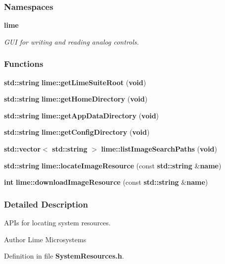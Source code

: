 \subsubsection*{Namespaces}
\begin{DoxyCompactItemize}
\item 
 {\bf lime}
\begin{DoxyCompactList}\small\item\em G\+UI for writing and reading analog controls. \end{DoxyCompactList}\end{DoxyCompactItemize}
\subsubsection*{Functions}
\begin{DoxyCompactItemize}
\item 
{\bf std\+::string} {\bf lime\+::get\+Lime\+Suite\+Root} ({\bf void})
\item 
{\bf std\+::string} {\bf lime\+::get\+Home\+Directory} ({\bf void})
\item 
{\bf std\+::string} {\bf lime\+::get\+App\+Data\+Directory} ({\bf void})
\item 
{\bf std\+::string} {\bf lime\+::get\+Config\+Directory} ({\bf void})
\item 
{\bf std\+::vector}$<$ {\bf std\+::string} $>$ {\bf lime\+::list\+Image\+Search\+Paths} ({\bf void})
\item 
{\bf std\+::string} {\bf lime\+::locate\+Image\+Resource} (const {\bf std\+::string} \&{\bf name})
\item 
{\bf int} {\bf lime\+::download\+Image\+Resource} (const {\bf std\+::string} \&{\bf name})
\end{DoxyCompactItemize}


\subsubsection{Detailed Description}
A\+P\+Is for locating system resources. 

\begin{DoxyAuthor}{Author}
Lime Microsystems 
\end{DoxyAuthor}


Definition in file {\bf System\+Resources.\+h}.

